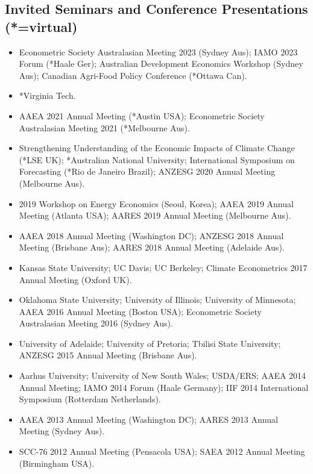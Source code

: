 \documentclass[10pt]{article}
\begin{document}
	\subsection*{Invited Seminars and Conference Presentations (*=virtual)}
	\begin{itemize}
		\item {} Econometric Society Australasian Meeting 2023 (Sydney Aus); IAMO 2023 Forum (*Haale Ger); Australian Development Economics Workshop (Sydney Aus); Canadian Agri-Food Policy Conference (*Ottawa Can).
		\item {} *Virginia Tech.
		\item {} AAEA 2021 Annual Meeting (*Austin USA); Econometric Society Australasian Meeting 2021 (*Melbourne Aus).
		\item {} Strengthening Understanding of the Economic Impacts of Climate Change (*LSE UK); *Australian National University; International Symposium on Forecasting (*Rio de Janeiro Brazil); ANZESG 2020 Annual Meeting (Melbourne Aus).
		\item {} 2019 Workshop on Energy Economics (Seoul, Korea); AAEA 2019 Annual Meeting (Atlanta USA); AARES 2019 Annual Meeting (Melbourne Aus).
		\item {} AAEA 2018 Annual Meeting (Washington DC); ANZESG 2018 Annual Meeting (Brisbane Aus); AARES 2018 Annual Meeting (Adelaide Aus).
		\item {} Kansas State University; UC Davis; UC Berkeley; Climate Econometrics 2017 Annual Meeting (Oxford UK).
		\item {} Oklahoma State University; University of Illinois; University of Minnesota; AAEA 2016 Annual Meeting (Boston USA); Econometric Society Australasian Meeting 2016 (Sydney Aus).
		\item {} University of Adelaide; University of Pretoria; Tbilisi State University; ANZESG 2015 Annual Meeting (Brisbane Aus).
		\item {} Aarhus University; University of New South Wales; USDA/ERS; AAEA 2014 Annual Meeting; IAMO 2014 Forum (Haale Germany); IIF 2014 International Symposium (Rotterdam Netherlands).
		\item {} AAEA 2013 Annual Meeting (Washington DC); AARES 2013 Annual Meeting (Sydney Aus).
		\item {} SCC-76 2012 Annual Meeting (Pensacola USA); SAEA 2012 Annual Meeting (Birmingham USA).
	\end{itemize}
	
\end{document}
